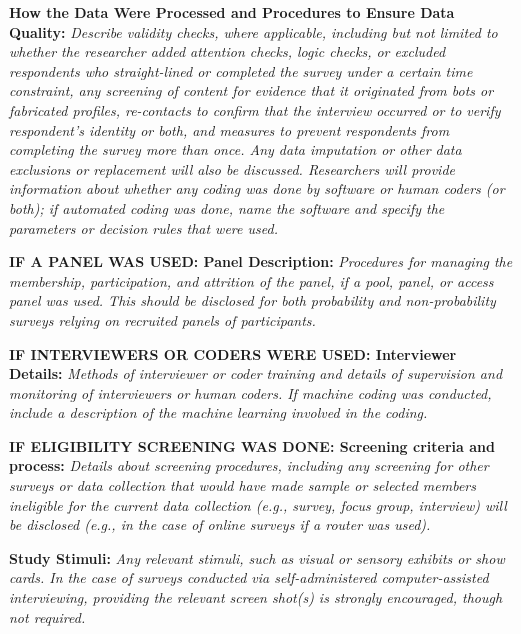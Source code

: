 \documentclass{article}
\begin{document}
\medskip

\textbf{How the Data Were Processed and Procedures to Ensure Data Quality:} \textit{Describe validity checks, where applicable, including but not limited to whether the researcher added attention checks, logic checks, or excluded respondents who straight-lined or completed the survey under a certain time constraint, any screening of content for evidence that it originated from bots or fabricated profiles, re-contacts to confirm that the interview occurred or to verify respondent's identity or both, and measures to prevent respondents from completing the survey more than once. Any data imputation or other data exclusions or replacement will also be discussed. Researchers will provide information about whether any coding was done by software or human coders (or both); if automated coding was done, name the software and specify the parameters or decision rules that were used.}

\medskip

\textbf{IF A PANEL WAS USED: Panel Description:} \textit{Procedures for managing the membership, participation, and attrition of the panel, if a pool, panel, or access panel was used. This should be disclosed for both probability and non-probability surveys relying on recruited panels of participants.}

\medskip

\textbf{IF INTERVIEWERS OR CODERS WERE USED: Interviewer Details:} \textit{Methods of interviewer or coder training and details of supervision and monitoring of interviewers or human coders. If machine coding was conducted, include a description of the machine learning involved in the coding.}

\medskip

\textbf{IF ELIGIBILITY SCREENING WAS DONE: Screening criteria and process:} \textit{Details about screening procedures, including any screening for other surveys or data collection that would have made sample or selected members ineligible for the current data collection (e.g., survey, focus group, interview) will be disclosed (e.g., in the case of online surveys if a router was used).}

\medskip

\textbf{Study Stimuli:} \textit{Any relevant stimuli, such as visual or sensory exhibits or show cards. In the case of surveys conducted via self-administered computer-assisted interviewing, providing the relevant screen shot(s) is strongly encouraged, though not required.}
\end{document}
